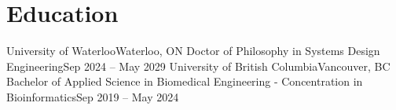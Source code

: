 \section{Education}
  \resumeSubHeadingListStart
    \resumeSubheading
      {University of Waterloo}{Waterloo, ON}
      {Doctor of Philosophy in Systems Design Engineering}{Sep 2024 -- May 2029}
    \resumeSubheading
      {University of British Columbia}{Vancouver, BC}
      {Bachelor of Applied Science in Biomedical Engineering - Concentration in Bioinformatics}{Sep 2019 -- May 2024}
  \resumeSubHeadingListEnd
